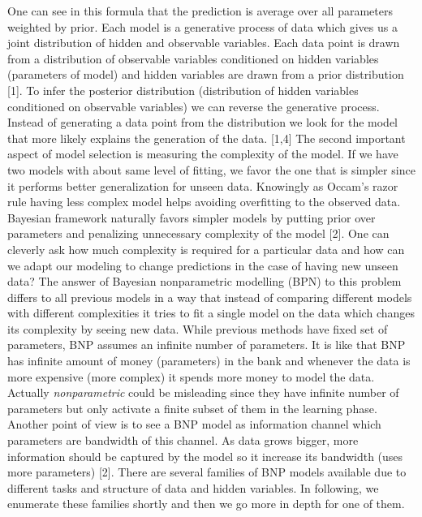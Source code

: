 One can see in this formula that the prediction is average over all parameters weighted by prior. 
Each model is a generative process of data which gives us a joint distribution of hidden and observable variables. 
Each data point is drawn from a distribution of observable variables conditioned on 
hidden variables (parameters of model) and hidden variables are drawn from a prior distribution [1]. 
To infer the posterior distribution (distribution of hidden variables conditioned on observable variables) 
we can reverse the generative process. 
Instead of generating a data point from the distribution we look for the model that more likely explains 
the generation of the data. [1,4]
The second important aspect of model selection is measuring the complexity of the model. 
If we have two models with about same level of fitting, we favor the one that is simpler since it 
performs better generalization for unseen data. Knowingly as Occam’s razor rule having 
less complex model helps avoiding overfitting to the observed data. Bayesian 
framework naturally favors simpler models by putting prior over parameters 
and penalizing unnecessary complexity of the model [2]. 
One can cleverly ask how much complexity is required for a particular data and how can 
we adapt our modeling to change predictions in the case of having new unseen data? 
The answer of Bayesian nonparametric modelling (BPN) to this problem differs to all previous models 
in a way that instead of comparing different models with different complexities it tries to fit 
a single model on the data which changes its complexity by seeing new data. 
While previous methods have fixed set of parameters, BNP assumes an infinite number of parameters. 
It is like that BNP has infinite amount of money (parameters) in the bank and whenever 
the data is more expensive (more complex) it spends more money to model the data. 
Actually \textit{nonparametric} could be misleading  since they have infinite number of parameters 
but only activate a finite subset of them in the learning phase.  
Another point of view is to see a BNP model as information channel which parameters are bandwidth of this channel. 
As data grows bigger, more information should be captured by the model so it increase its bandwidth 
(uses more parameters) [2].
There are several families of BNP models available due to different tasks and structure of data and 
hidden variables. In following, we enumerate these families shortly and then we
go more in depth for one of them.


